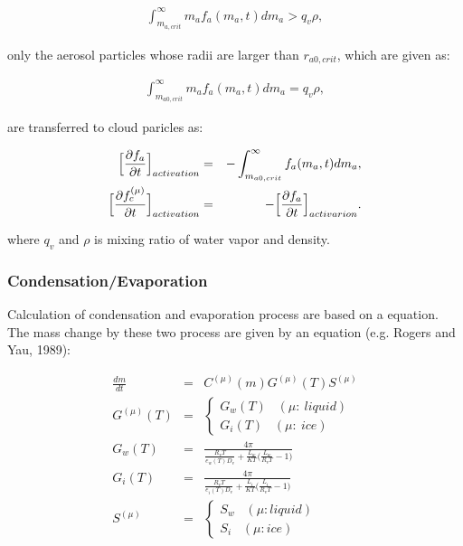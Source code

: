 \begin{eqnarray}
\int_{m_{a,crit}}^{\infty}m_{a}f_{a}(m_{a},t)dm_{a} > q_{v}\rho,
\end{eqnarray}

only the aerosol particles whose radii are larger than $r_{a0,crit}$, which are given as:

\begin{eqnarray}
\int_{m_{a0,crit}}^{\infty}m_{a}f_{a}(m_{a},t)dm_{a} = q_{v}\rho,
\end{eqnarray}


are transferred to cloud paricles as:

\begin{eqnarray}
\Bigl[\frac{\partial f_{a}}{\partial t}\Bigr]_{activation}&=&-\int_{m_{a0,crit}}^{\infty}f_{a}(m_{a},t)dm_{a},\\
\Bigl[\frac{\partial f_{c}^{(\mu)}}{\partial t}\Bigr]_{activation}&=&-\Bigl[\frac{\partial f_{a}}{\partial t}\Bigr]_{activarion}.
\end{eqnarray}

where $q_{v}$ and $\rho$ is mixing ratio of water vapor and density.

\subsubsection{Condensation/Evaporation}
Calculation of condensation and evaporation process are based on a equation. The mass change by these two process are given by an equation (e.g. Rogers and Yau, 1989):

\begin{eqnarray}
\frac{dm}{dt}&=&C^{(\mu)}(m)G^{(\mu)}(T)S^{(\mu)}\\
G^{(\mu)}(T)&=&
\left\{
\begin{array}{l}
G_{w}(T)\;\;\;(\mu : \:liquid)\\
G_{i}(T)\;\;\;(\mu : \:ice)
\end{array}\right. \nonumber\\
G_{w}(T)&=&\frac{4\pi}{\frac{R_{v}T}{e_{w}(T)D_{v}}+\frac{L_{w}}{KT}\bigl( \frac{L_{w}}{R_{v}T}-1\Bigr )}\nonumber\\
G_{i}(T)&=&\frac{4\pi}{\frac{R_{v}T}{e_{i}(T)D_{v}}+\frac{L_{i}}{KT}\bigl( \frac{L_{i}}{R_{v}T}-1\Bigr )}\nonumber\\
S^{(\mu)}&=&
\left\{
\begin{array}{l}
S_{w}\;\;\;(\mu : liquid)\\
S_{i}\;\;\;(\mu : ice)
\end{array}\right.\nonumber
\end{eqnarray}

